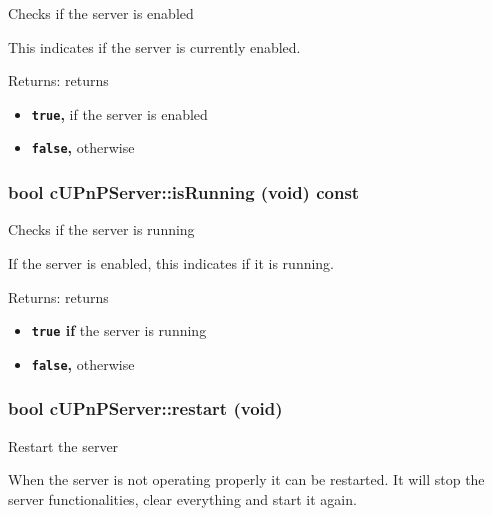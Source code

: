 Checks if the server is enabled

This indicates if the server is currently enabled.

\begin{Desc}
\item[Returns:]returns\begin{itemize}
\item {\bf {\tt true},} if the server is enabled\item {\bf {\tt false},} otherwise \end{itemize}
\end{Desc}
\hypertarget{classcUPnPServer_af5358b41e19ba2917371c2d118d0145}{
\subsubsection[{isRunning}]{\setlength{\rightskip}{0pt plus 5cm}bool cUPnPServer::isRunning (void) const}}
\label{classcUPnPServer_af5358b41e19ba2917371c2d118d0145}


Checks if the server is running

If the server is enabled, this indicates if it is running.

\begin{Desc}
\item[Returns:]returns\begin{itemize}
\item {\bf {\tt true} if} the server is running\item {\bf {\tt false},} otherwise \end{itemize}
\end{Desc}
\hypertarget{classcUPnPServer_9dd50cfea9042d49ef58b99b44c0c5af}{
\subsubsection[{restart}]{\setlength{\rightskip}{0pt plus 5cm}bool cUPnPServer::restart (void)}}
\label{classcUPnPServer_9dd50cfea9042d49ef58b99b44c0c5af}


Restart the server

When the server is not operating properly it can be restarted. It will stop the server functionalities, clear everything and start it again.

